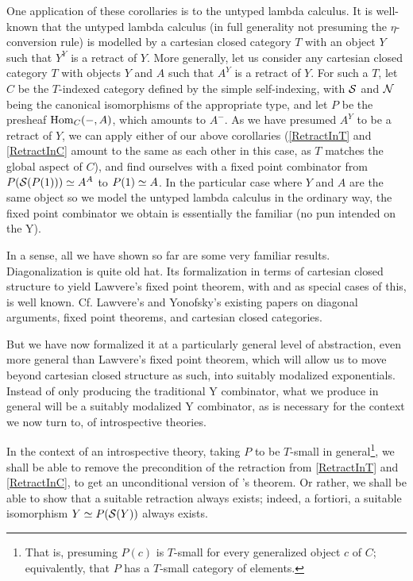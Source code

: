 \begin{observation}\label{YCombinator}
One application of these corollaries is to the untyped lambda calculus. It is well-known that the untyped lambda calculus (in full generality not presuming the $\eta$-conversion rule) is modelled by a cartesian closed category $T$ with an object $Y$ such that $Y^Y$ is a retract of $Y$. More generally, let us consider any cartesian closed category $T$ with objects $Y$ and $A$ such that $A^Y$ is a retract of $Y$. For such a $T$, let $C$ be the $T$-indexed category defined by the simple self-indexing, with $\mathcal{S}$ and $\mathcal{N}$ being the canonical isomorphisms of the appropriate type, and let $P$ be the presheaf $\operatorname{Hom}_C(-, A)$, which amounts to $A^{-}$. As we have presumed $A^Y$ to be a retract of $Y$, we can apply either of our above corollaries (\cref{RetractInT} and \cref{RetractInC} amount to the same as each other in this case, as $T$ matches the global aspect of $C$), and find ourselves with a fixed point combinator from $P(\mathcal{S}(P(1))) \simeq A^A$ to $P(1) \simeq A$. In the particular case where $Y$ and $A$ are the same object so we model the untyped lambda calculus in the ordinary way, the fixed point combinator we obtain is essentially the familiar  (no pun intended on the Y).
\end{observation}

In a sense, all we have shown so far are some very familiar results. Diagonalization is quite old hat. Its formalization in terms of cartesian closed structure to yield Lawvere's fixed point theorem, with  and  as special cases of this, is well known. Cf. Lawvere's and Yonofsky's existing papers on diagonal arguments, fixed point theorems, and cartesian closed categories. 

But we have now formalized it at a particularly general level of abstraction, even more general than Lawvere's fixed point theorem, which will allow us to move beyond cartesian closed structure as such, into suitably modalized exponentials. Instead of only producing the traditional Y combinator, what we produce in general will be a suitably modalized Y combinator, as is necessary for the context we now turn to, of introspective theories.

In the context of an introspective theory, taking $P$ to be $T$-small in general\footnote{That is, presuming $P(c)$ is $T$-small for every generalized object $c$ of $C$; equivalently, that $P$ has a $T$-small category of elements.}, we shall be able to remove the precondition of the retraction from \cref{RetractInT} and \cref{RetractInC}, to get an unconditional version of \Loeb's theorem. Or rather, we shall be able to show that a suitable retraction always exists; indeed, a fortiori, a suitable isomorphism $Y \simeq P(\mathcal{S}(Y))$ always exists.

